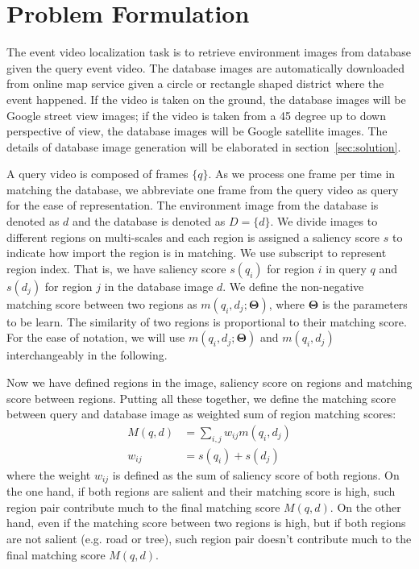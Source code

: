 \section{Problem Formulation}
\label{sec:problem}
The event video localization task is to retrieve environment images from database given the query event video. 
The database images are automatically downloaded from online map service given a circle or rectangle shaped district where the event happened. 
If the video is taken on the ground, the database images will be Google street view images;
if the video is taken from a 45 degree up to down perspective of view, the database images will be Google satellite images. 
The details of database image generation will be elaborated in section~\ref{sec:solution}. 

A query video is composed of frames $\{q\}$. 
As we process one frame per time in matching the database, we abbreviate one frame from the query video as query for the ease of representation. 
The environment image from the database is denoted as $d$ and the database is denoted as $D = \{d\}$. 
We divide images to different regions on multi-scales and each region is assigned a saliency score $s$ to indicate how import the region is in matching.  
We use subscript to represent region index. 
That is, we have saliency score $s(q_i)$ for region $i$ in query $q$ and $s(d_j)$ for region $j$ in the database image $d$. 
We define the non-negative matching score between two regions as $m(q_i, d_j; \mathbf{\Theta})$, where $\mathbf{\Theta}$ is the parameters to be learn. The similarity of two regions is proportional to their matching score.
For the ease of notation, we will use $m(q_i, d_j; \mathbf{\Theta})$ and $m(q_i, d_j)$ interchangeably in the following. 

Now we have defined regions in the image, saliency score on regions and matching score between regions. 
Putting all these together, we define the matching score between query and database image as weighted sum of region matching scores:
\begin{align}
\label{eq:img_match}
M(q, d) &= \sum_{i, j} w_{ij} m(q_i, d_j)\\
\label{eq:weight}
w_{ij} &= s(q_i) + s(d_j)
\end{align}
where the weight $w_{ij}$ is defined as the sum of saliency score of both regions. 
On the one hand, if both regions are salient and their matching score is high, such region pair contribute much to the final matching score $M(q, d)$. 
On the other hand, even if the matching score between two regions is high, but if both regions are not salient (e.g. road or tree), such region pair doesn't contribute much to the final matching score $M(q, d)$. 

